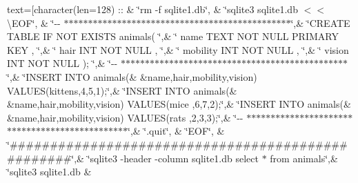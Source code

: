 text=\mbox{[}character(len=128) \+:\+: \& \char`\"{}rm -\/f sqlite1.\+db\char`\"{}, \& \char`\"{}sqlite3 sqlite1.\+db $<$$<$\textbackslash{}\+E\+O\+F\char`\"{}, \& \char`\"{}-\/-\/ $\ast$$\ast$$\ast$$\ast$$\ast$$\ast$$\ast$$\ast$$\ast$$\ast$$\ast$$\ast$$\ast$$\ast$$\ast$$\ast$$\ast$$\ast$$\ast$$\ast$$\ast$$\ast$$\ast$$\ast$$\ast$$\ast$$\ast$$\ast$$\ast$$\ast$$\ast$$\ast$$\ast$$\ast$$\ast$$\ast$$\ast$$\ast$$\ast$$\ast$$\ast$$\ast$$\ast$$\ast$$\ast$$\ast$$\ast$\char`\"{},\& \char`\"{}\+C\+R\+E\+A\+T\+E T\+A\+B\+L\+E I\+F N\+O\+T E\+X\+I\+S\+T\+S animals(               \char`\"{},\& \char`\"{}   name        T\+E\+X\+T   N\+O\+T N\+U\+L\+L   P\+R\+I\+M\+A\+R\+Y K\+E\+Y ,    \char`\"{},\& \char`\"{}   hair        I\+N\+T    N\+O\+T N\+U\+L\+L   ,                \char`\"{},\& \char`\"{}   mobility    I\+N\+T    N\+O\+T N\+U\+L\+L   ,                \char`\"{},\& \char`\"{}   vision      I\+N\+T    N\+O\+T N\+U\+L\+L   );               \char`\"{},\& \char`\"{}-\/-\/ $\ast$$\ast$$\ast$$\ast$$\ast$$\ast$$\ast$$\ast$$\ast$$\ast$$\ast$$\ast$$\ast$$\ast$$\ast$$\ast$$\ast$$\ast$$\ast$$\ast$$\ast$$\ast$$\ast$$\ast$$\ast$$\ast$$\ast$$\ast$$\ast$$\ast$$\ast$$\ast$$\ast$$\ast$$\ast$$\ast$$\ast$$\ast$$\ast$$\ast$$\ast$$\ast$$\ast$$\ast$$\ast$$\ast$$\ast$\char`\"{},\& \char`\"{}\+I\+N\+S\+E\+R\+T I\+N\+T\+O animals(\&
     \&name,hair,mobility,vision) V\+A\+L\+U\+E\+S(\textquotesingle{}kittens\textquotesingle{},4,5,1);\char`\"{},\& \char`\"{}\+I\+N\+S\+E\+R\+T I\+N\+T\+O animals(\&
     \&name,hair,mobility,vision) V\+A\+L\+U\+E\+S(\textquotesingle{}mice\textquotesingle{}   ,6,7,2);\char`\"{},\& \char`\"{}\+I\+N\+S\+E\+R\+T I\+N\+T\+O animals(\&
     \&name,hair,mobility,vision) V\+A\+L\+U\+E\+S(\textquotesingle{}rats\textquotesingle{}   ,2,3,3);\char`\"{},\& \char`\"{}-\/-\/ $\ast$$\ast$$\ast$$\ast$$\ast$$\ast$$\ast$$\ast$$\ast$$\ast$$\ast$$\ast$$\ast$$\ast$$\ast$$\ast$$\ast$$\ast$$\ast$$\ast$$\ast$$\ast$$\ast$$\ast$$\ast$$\ast$$\ast$$\ast$$\ast$$\ast$$\ast$$\ast$$\ast$$\ast$$\ast$$\ast$$\ast$$\ast$$\ast$$\ast$$\ast$$\ast$$\ast$$\ast$$\ast$$\ast$$\ast$\char`\"{},\& \char`\"{}.\+quit\char`\"{}, \& \char`\"{}\+E\+O\+F\char`\"{}, \& \char`\"{}\#\#\#\#\#\#\#\#\#\#\#\#\#\#\#\#\#\#\#\#\#\#\#\#\#\#\#\#\#\#\#\#\#\#\#\#\#\#\#\#\#\#\#\#\#\#\#\#\#\#\char`\"{},\& \char`\"{}sqlite3 -\/header -\/column sqlite1.\+db  \textquotesingle{}select $\ast$ from animals\textquotesingle{}\char`\"{},\& \char`\"{}sqlite3 sqlite1.\+db  \&
$$
